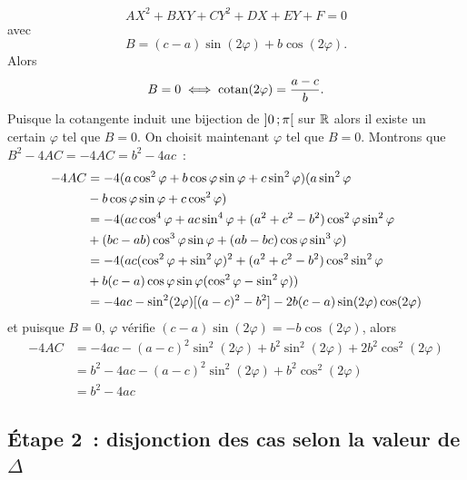 \begin{equation}
  AX^2+BXY+CY^2+DX+EY+F=0 \label{eq:eqz}
\end{equation}
avec
\begin{equation}
 B=(c-a)\sin(2\varphi)+b\cos(2\varphi). 
\end{equation}
Alors
\begin{equation}
 B=0 \iff \operatorname{cotan}(2\varphi)=\frac{a-c}{b}. 
\end{equation}
Puisque la cotangente induit une bijection de $\left] 0 \, ;  \pi \right[$ sur $\mathbb{R}$ alors il existe un certain $\varphi$ tel que $B=0$. On choisit maintenant $\varphi$ tel que $B=0$. Montrons que $B^2-4AC=-4AC=b^2-4ac$~:
\begin{align}
  -4AC&=-4(a\cos^2\varphi+b\cos\varphi\sin\varphi +c\sin^2\varphi)(a\sin^2\varphi \\ &- b\cos\varphi\sin\varphi +c\cos^2\varphi) \notag\\
  &=-4(ac\cos^4\varphi + ac\sin^4\varphi+(a^2+c^2-b^2)\cos^2\varphi\sin^2\varphi\\ & +(bc-ab)\cos^3\varphi\sin\varphi+(ab-bc)\cos\varphi\sin^3\varphi) \notag\\
  &=-4(ac(\cos^2\varphi+\sin^2\varphi)^2+(a^2+c^2-b^2)\cos^2\sin^2\varphi \\ & +b(c-a)\cos\varphi\sin\varphi(\cos^2\varphi-\sin^2\varphi)) \notag\\
  &=-4ac-\sin^2(2\varphi)[(a-c)^2-b^2]-2b(c-a)\sin(2\varphi)\cos(2\varphi)
\end{align}
et puisque $B=0$, $\varphi$ vérifie $(c-a)\sin(2\varphi)=-b\cos(2\varphi)$, alors
\begin{align}
  -4AC&=-4ac-(a-c)^2\sin^2(2\varphi)+b^2\sin^2(2\varphi)+2b^2\cos^2(2\varphi)\\
  &=b^2-4ac-(a-c)^2\sin^2(2\varphi)+b^2\cos^2(2\varphi)\\
  &=b^2-4ac
\end{align}

\subsection{Étape 2~: disjonction des cas selon la valeur de $\Delta$}
